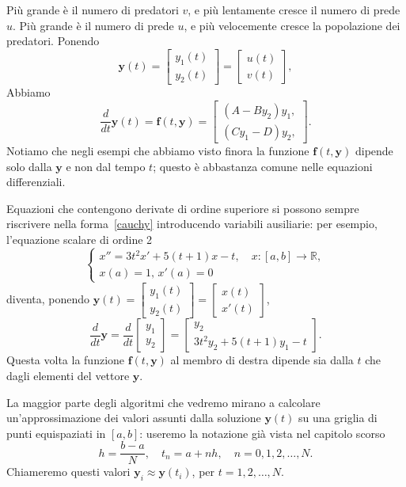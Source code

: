 \documentclass[a4paper]{report}
\theoremstyle{definiton}
\theoremstyle{remark}
\newcommand{\y}{\mathbf{y}}
\newcommand{\f}{\mathbf{f}}
\begin{document}
Più grande è il numero di predatori $v$, e più lentamente cresce il numero di prede $u$. Più grande è il numero di prede $u$, e più velocemente cresce la popolazione dei predatori. Ponendo
\[
    \y(t) = 
    \begin{bmatrix}
        y_1(t) \\ 
        y_2(t)
    \end{bmatrix} = 
    \begin{bmatrix}
        u(t)\\
        v(t)
    \end{bmatrix},
\]
Abbiamo
\[
    \frac{d}{dt} \y(t) = \f(t,\y) = \begin{bmatrix}
        (A-By_2)y_1,\\
        (Cy_1-D)y_2,
    \end{bmatrix}.
\]
Notiamo che negli esempi che abbiamo visto finora la funzione $\f(t,\y)$ dipende solo dalla $\y$ e non dal tempo $t$; questo è abbastanza comune nelle equazioni differenziali.

Equazioni che contengono derivate di ordine superiore si possono sempre riscrivere nella forma~\eqref{cauchy} introducendo variabili ausiliarie: per esempio, l'equazione scalare di ordine 2
\[
\begin{cases}
x'' = 3t^2 x' + 5(t+1)x - t, \quad x:[a,b]\to\mathbb{R}, \\
x(a) = 1, \, x'(a) = 0
\end{cases}
\]
diventa, ponendo $\mathbf{y}(t) = \begin{bmatrix}
    y_1(t)\\
    y_2(t)
\end{bmatrix} = \begin{bmatrix}
    x(t)\\
    x'(t)
\end{bmatrix}$,
\[
\frac{d}{dt} \mathbf{y} = 
\frac{d}{dt}
\begin{bmatrix}
    y_1\\ y_2
\end{bmatrix} = \begin{bmatrix}
    y_2\\
    3t^2y_2 + 5(t+1)y_1 - t
\end{bmatrix}.
\]
Questa volta la funzione $\f(t,\y)$ al membro di destra dipende sia dalla $t$ che dagli elementi del vettore $\y$.

La maggior parte degli algoritmi che vedremo mirano a calcolare un'approssimazione dei valori assunti dalla soluzione $\y(t)$ su una griglia di punti equispaziati in $[a,b]$: useremo la notazione già vista nel capitolo scorso
\[
h = \frac{b-a}{N}, \quad t_n = a + nh, \quad n = 0,1,2,\dots,N.
\]
Chiameremo questi valori $\y_i \approx \y(t_i)$, per $t = 1,2,\dots, N$.
\end{document}
